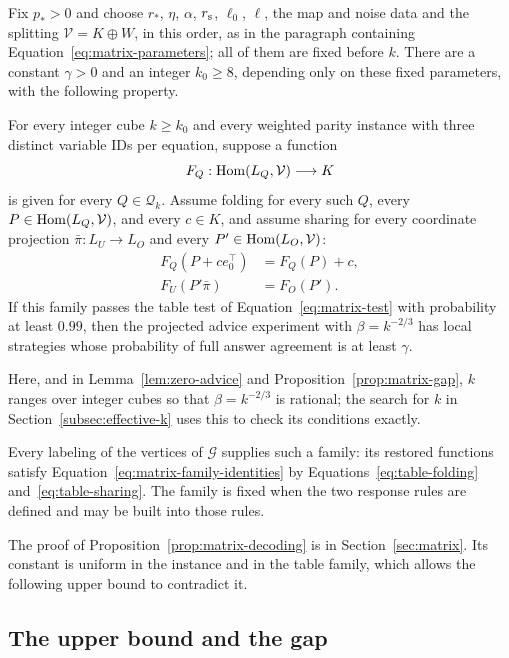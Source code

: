 \begin{proposition}
\label{prop:matrix-decoding}
Fix $p_*>0$ and choose $r_*$, $\eta$, $\alpha$, $r_{\rm s}$, $\ell_0$, $\ell$,
the map and noise data and the splitting $\mathcal V=K\oplus W$, in this order,
as in the paragraph containing Equation~\eqref{eq:matrix-parameters};
all of them are fixed before $k$.  There are a constant $\gamma>0$ and an integer $k_0\ge8$, depending only on
these fixed parameters, with the following property.

For every integer cube $k\ge k_0$ and every weighted parity instance
with three distinct variable IDs per equation, suppose a function
\[
 F_Q:\operatorname{Hom}(L_Q,\mathcal V)\longrightarrow K
\]
is given for every $Q\in\mathcal Q_k$.  Assume folding for every such
$Q$, every $P\in\operatorname{Hom}(L_Q,\mathcal V)$, and every $c\in K$, and assume
sharing for every coordinate projection $\bar\pi:L_U\to L_O$ and every
$P'\in\operatorname{Hom}(L_O,\mathcal V)$:
\begin{equation}
 \begin{aligned}
 F_Q(P+c e_0^\top)&=F_Q(P)+c,\\
 F_U(P'\bar\pi)&=F_O(P').
 \end{aligned}
 \label{eq:matrix-family-identities}
\end{equation}
If this family passes the table test of Equation~\eqref{eq:matrix-test}
with probability at least $0.99$, then the projected advice experiment
with $\beta=k^{-2/3}$ has local strategies whose probability of full
answer agreement is at least $\gamma$.
\end{proposition}

Here, and in Lemma~\ref{lem:zero-advice} and Proposition~\ref{prop:matrix-gap},
$k$ ranges over integer cubes so that $\beta=k^{-2/3}$ is rational; the
search for $k$ in Section~\ref{subsec:effective-k} uses this to check its
conditions exactly.

Every labeling of the vertices of $\mathcal G$ supplies such a family:
its restored functions satisfy Equation~\eqref{eq:matrix-family-identities}
by Equations~\eqref{eq:table-folding} and~\eqref{eq:table-sharing}.  The family is fixed when the
two response rules are defined and may be built into those rules.


The proof of Proposition~\ref{prop:matrix-decoding} is in
Section~\ref{sec:matrix}.  Its constant is uniform in the instance and
in the table family, which allows the following upper bound to contradict it.

\subsection{The upper bound and the gap}

